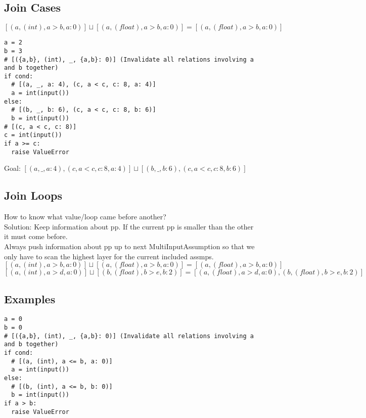 \documentclass[11pt]{article}
\begin{document}
\subsection{Join Cases}

$[(a, (int), a > b, a{:}0)] \sqcup [(a, (float), a > b, a{:}0)] = [(a, (float), a > b, a{:}0)]$\\

\begin{lstlisting}
a = 2
b = 3
# [({a,b}, (int), _, {a,b}: 0)] (Invalidate all relations involving a and b together)
if cond:
  # [(a, _, a: 4), (c, a < c, c: 8, a: 4)]
  a = int(input())
else:
  # [(b, _, b: 6), (c, a < c, c: 8, b: 6)]
  b = int(input())
# [(c, a < c, c: 8)]
c = int(input())
if a >= c:
  raise ValueError
\end{lstlisting}


Goal: $[(a, \_, a: 4), (c, a < c, c: 8, a: 4)] \sqcup [(b, \_, b: 6), (c, a < c, c: 8, b: 6)]$

\subsection{Join Loops}

How to know what value/loop came before another?\\
Solution: Keep information about pp. If the current pp is smaller than the other it must come before.\\
Always push information about pp up to next MultiInputAssumption so that we only have to scan the highest layer for the current included assmps.\\

$[(a, (int), a > b, a{:}0)] \sqcup [(a, (float), a > b, a{:}0)] = [(a, (float), a > b, a{:}0)]$\\
$[(a, (int), a > d, a{:}0)] \sqcup [(b, (float), b > e, b{:}2)] = [(a, (float), a > d, a{:}0), (b, (float), b > e, b{:}2)]$\\


\subsection{Examples}

\begin{lstlisting}
a = 0
b = 0
# [({a,b}, (int), _, {a,b}: 0)] (Invalidate all relations involving a and b together)
if cond:
  # [(a, (int), a <= b, a: 0)]
  a = int(input())
else:
  # [(b, (int), a <= b, b: 0)]
  b = int(input())
if a > b:
  raise ValueError
\end{lstlisting}
\end{document}
